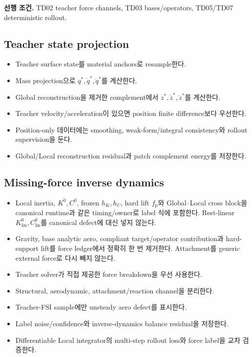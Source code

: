 \documentclass[10pt,a4paper]{article}
\newcommand{\todo}{\textcolor{TodoGray}{\(\square\)}}
\begin{document}
\textbf{선행 조건.} TD02 teacher force channels, TD03 bases/operators, TD05/TD07 deterministic rollout.

\subsection*{Teacher state projection}

\begin{itemize}
  \item[\todo] Teacher surface state를 material anchors로 resample한다.
  \item[\todo] Mass projection으로 \(q^*,\dot q^*,\ddot q^*\)를 계산한다.
  \item[\todo] Global reconstruction을 제거한 complement에서 \(z^*,\dot z^*,\ddot z^*\)를 계산한다.
  \item[\todo] Teacher velocity/acceleration이 있으면 position finite difference보다 우선한다.
  \item[\todo] Position-only 데이터에는 smoothing, weak-form/integral consistency와 rollout supervision을 둔다.
  \item[\todo] Global/Local reconstruction residual과 patch complement energy를 저장한다.
\end{itemize}

\subsection*{Missing-force inverse dynamics}

\begin{itemize}
  \item[\todo] Local inertia, \(K^0,C^0\), frozen \(h_K,h_C\), hard lift \(f_{\mathrm p}\)와
  Global--Local cross block을 canonical runtime과 같은 timing/owner로 label 식에 포함한다.
  Rest-linear \(K_{\mathrm{lin}}^0,C_{\mathrm{lin}}^0\)를 canonical defect에 대신 넣지 않는다.
  \item[\todo] Gravity, base analytic aero, compliant target/operator contribution과 hard-support lift를
  force ledger에서 정확히 한 번 제거한다. Attachment를 generic external force로 다시 빼지 않는다.
  \item[\todo] Teacher solver가 직접 제공한 force breakdown을 우선 사용한다.
  \item[\todo] Structural, aerodynamic, attachment/reaction channel을 분리한다.
  \item[\todo] Teacher-FSI sample에만 unsteady aero defect를 표시한다.
  \item[\todo] Label noise/confidence와 inverse-dynamics balance residual을 저장한다.
  \item[\todo] Differentiable Local integrator의 multi-step rollout loss와 force label을 교차 검증한다.
\end{itemize}
\end{document}
